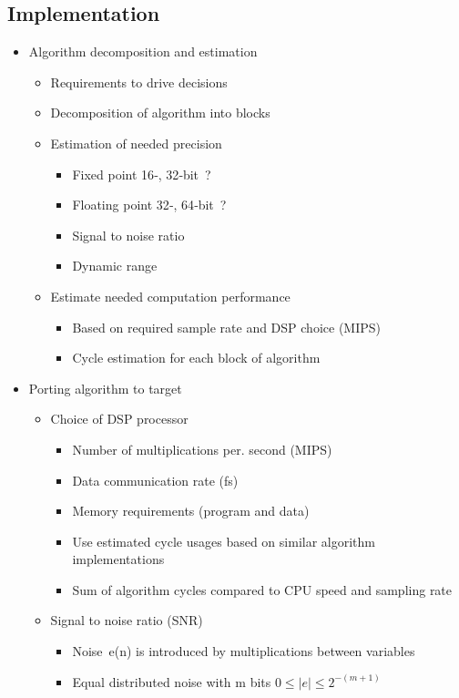 \subsection{Implementation}
\begin{itemize}
	\item Algorithm decomposition and estimation
	\begin{itemize}
		\item Requirements to drive decisions
		\item Decomposition of algorithm into blocks
		\item Estimation of needed precision
		\begin{itemize}
			\item Fixed point 16‐, 32‐bit ?
			\item Floating point 32‐, 64‐bit ?
			\item Signal to noise ratio
			\item Dynamic range
		\end{itemize}
		\item Estimate needed computation performance
		\begin{itemize}
			\item Based on required sample rate and DSP choice (MIPS)
			\item Cycle estimation for each block of algorithm
		\end{itemize}
	\end{itemize}
	\item Porting algorithm to target
	\begin{itemize}
		\item Choice of DSP processor
		\begin{itemize}
			\item Number of multiplications per. second (MIPS)
			\item Data communication rate (fs)
			\item Memory requirements (program and data)
			\item Use estimated cycle usages based on similar algorithm implementations
			\item Sum of algorithm cycles compared to CPU speed and sampling rate
		\end{itemize}
		\item Signal to noise ratio (SNR)
		\begin{itemize}
			\item Noise e(n) is introduced by multiplications between variables
			\item Equal distributed noise with m bits $0 \leq |e|\leq 2^{-(m+1)}$

\end{itemize}
\end{itemize}
\end{itemize}
